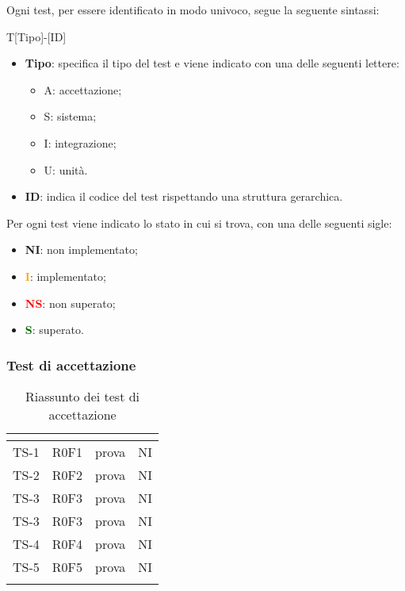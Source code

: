 Ogni test, per essere identificato in modo univoco, segue la seguente sintassi:
\begin{center}
	T[Tipo]-[ID]
\end{center}
\begin{itemize}
	\item \textbf{Tipo}: specifica il tipo del test	e viene indicato con una delle seguenti lettere:
	\begin{itemize}
		\item A: accettazione;
		\item S: sistema;
		\item I: integrazione;
		\item U: unità.
	\end{itemize}
	\item \textbf{ID}: indica il codice del test rispettando una struttura gerarchica.	
\end{itemize}
Per ogni test viene indicato lo stato in cui si trova, con una delle seguenti sigle:
\begin{itemize}
	\item \textbf{NI}: non implementato;
	\item \textcolor{orange}{\textbf{I}}: implementato;
	\item \textcolor{red}{\textbf{NS}}: non superato;
	\item \textcolor{darkgreen}{\textbf{S}}: superato.
\end{itemize}
\subsubsection{Test di accettazione}
\normalsize
\renewcommand{\arraystretch}{1}
\begin{longtable}{|C{2.5cm}|C{2.5cm}|C{6.5cm}|C{1.5cm}|}
	\hline
	\textbf{\color{title_text}{Test}} & \textbf{\color{title_text}{Requisito}} & \textbf{\color{title_text}{Descrizione}} & \textbf{\color{title_text}{Stato}} \\
	\hline
	\endhead
	{TS-1} & {R0F1} & prova  & {NI}\\
	\hline
	{TS-2} & {R0F2} & prova & {NI}\\
	\hline
	{TS-3} & {R0F3} & prova & {NI}\\
	\hline
	{TS-3} & {R0F3} & prova & {NI}\\
	\hline
	{TS-4} & {R0F4} & prova & {NI}\\
	\hline
	{TS-5} & {R0F5} & prova & {NI}\\
	\hline
	\caption{Riassunto dei test di accettazione}
	\label{tabella:riassunto ta}
\end{longtable}
\normalsize
\renewcommand{\arraystretch}{1}
